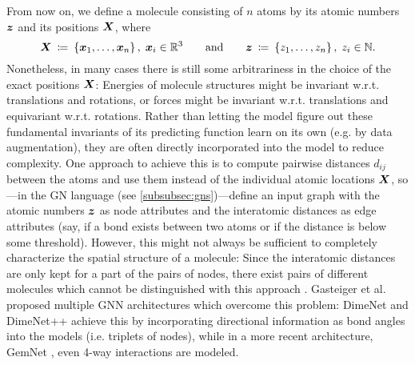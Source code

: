From now on, we define a molecule consisting of $n$ atoms by its atomic numbers 
$\boldsymbol{z}$ and its positions $\boldsymbol{X}$, where
\begin{equation}
    \boldsymbol{X} \: \coloneqq \: \left\{\boldsymbol{x}_1, \dots, \boldsymbol{x}_n\right\}, \; \boldsymbol{x}_i \in \mathbb{R}^3
    \qquad \text{and} \qquad 
    \boldsymbol{z} \: \coloneqq \: \left\{z_1, \dots, z_n\right\}, \; z_i \in \mathbb{N} \text{.}
    \label{eq:molecule_setup}
\end{equation}
Nonetheless, in many cases there is still some arbitrariness in the choice of the 
exact positions $\boldsymbol{X}$: Energies of molecule structures might be invariant w.r.t. 
translations and rotations, or forces might be invariant w.r.t. 
translations and equivariant w.r.t. rotations. Rather than letting the model figure out
these fundamental invariants of its predicting function learn on its own (e.g. by 
data augmentation), they are often directly incorporated into the model to reduce 
complexity. One approach to achieve this is to compute pairwise distances $d_{ij}$ 
between the atoms and use them instead of the individual atomic locations $\boldsymbol{X}$, 
so---in the GN language (see \ref{subsubsec:gns})---define an input graph with the atomic numbers $\boldsymbol{z}$ as 
node attributes and the interatomic distances as edge attributes (say, if a bond exists
between two atoms or if the distance is below some threshold). However, this might
not always be sufficient to completely characterize the spatial structure of a molecule:
Since the interatomic distances are only kept for a part of the pairs of 
nodes, there exist pairs of different molecules which cannot be
distinguished with this approach \cite[Appendix A]{DBLP:journals/corr/abs-2003-03123}.
Gasteiger et al. proposed multiple GNN architectures which overcome this
problem: DimeNet \cite{DBLP:journals/corr/abs-2003-03123} and 
DimeNet++ \cite{https://doi.org/10.48550/arxiv.2011.14115} achieve this
by incorporating directional information as bond angles into the models
(i.e. triplets of nodes), while in a more recent architecture, GemNet 
\cite{https://doi.org/10.48550/arxiv.2106.08903}, even 4-way interactions are
modeled.




